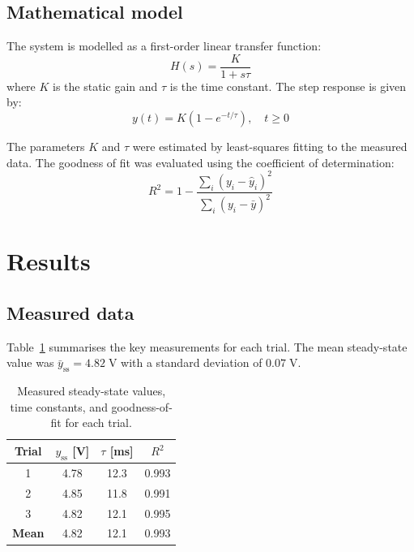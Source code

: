 \documentclass[12pt,a4paper]{article}
\begin{document}
\subsection{Mathematical model}

The system is modelled as a first-order linear transfer function:
\begin{equation}
  H(s) = \frac{K}{1 + s\tau}
  \label{eq:transfer}
\end{equation}
where $K$ is the static gain and $\tau$ is the time constant. The
step response is given by:
\begin{equation}
  y(t) = K \left(1 - e^{-t/\tau}\right), \quad t \geq 0
  \label{eq:step}
\end{equation}

The parameters $K$ and $\tau$ were estimated by least-squares fitting
to the measured data. The goodness of fit was evaluated using the
coefficient of determination:
\begin{equation}
  R^2 = 1 - \frac{\sum_i (y_i - \hat{y}_i)^2}{\sum_i (y_i - \bar{y})^2}
\end{equation}


\section{Results}
\label{sec:results}

\subsection{Measured data}

Table~\ref{tab:measurements} summarises the key measurements for each
trial. The mean steady-state value was $\bar{y}_\text{ss} = 4.82\;\text{V}$
with a standard deviation of $0.07\;\text{V}$.

\begin{table}[H]
  \centering
  \begin{tabular}{c c c c}
    \hline
    \textbf{Trial} & $y_\text{ss}$ [V] & $\tau$ [ms] & $R^2$ \\
    \hline
    1 & 4.78 & 12.3 & 0.993 \\
    2 & 4.85 & 11.8 & 0.991 \\
    3 & 4.82 & 12.1 & 0.995 \\
    \hline
    \textbf{Mean} & 4.82 & 12.1 & 0.993 \\
    \hline
  \end{tabular}
  \caption{Measured steady-state values, time constants, and
    goodness-of-fit for each trial.}
  \label{tab:measurements}
\end{table}
\end{document}
